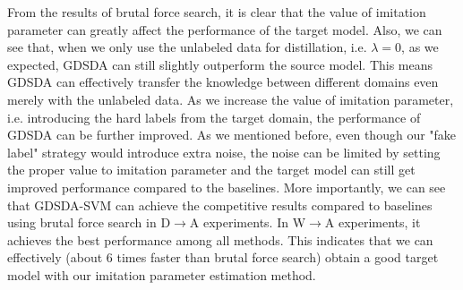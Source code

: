From the results of brutal force search, it is clear that the value of imitation parameter can greatly affect the performance of the target model.
Also, we can see that, when we only use the unlabeled data for distillation, i.e. $\lambda = 0$, as we expected, GDSDA can still slightly outperform the source model. This means GDSDA can effectively transfer the knowledge between different domains even merely with the unlabeled data. As we increase the value of imitation parameter, i.e. introducing the hard labels from the target domain, the performance of GDSDA can be further improved. As we mentioned before, even though our "fake label" strategy would introduce extra noise, the noise can be limited by setting the proper value to imitation parameter and the target model can still get improved performance compared to the baselines.
More importantly, we can see that GDSDA-SVM can achieve the competitive results compared to baselines using brutal force search in D$\rightarrow$A experiments. In W$\rightarrow$A experiments, it achieves the best performance among all methods. This indicates that we can effectively (about 6 times faster than brutal force search) obtain a good target model with our imitation parameter estimation method.
